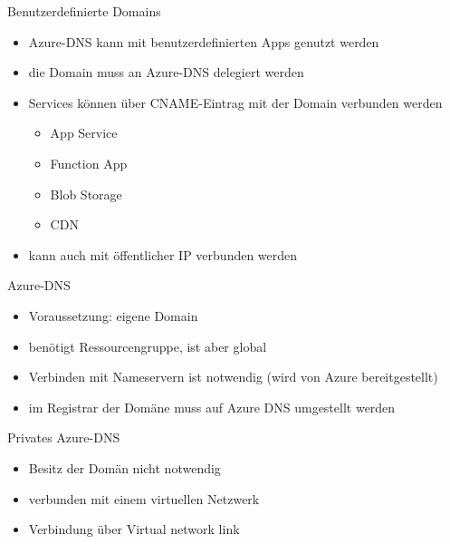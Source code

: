 \begin{flashcard}[]{Benutzerdefinierte Domains}
  \begin{itemize}
    \item Azure-DNS kann mit benutzerdefinierten Apps genutzt werden
    \item die Domain muss an Azure-DNS delegiert werden
    \item Services können über CNAME-Eintrag mit der Domain verbunden werden
      \begin{itemize}
        \item App Service
        \item Function App
        \item Blob Storage
        \item CDN
      \end{itemize}
    \item kann auch mit öffentlicher IP verbunden werden
  \end{itemize}
\end{flashcard}

\begin{flashcard}[]{Azure-DNS}
  \begin{itemize}
    \item Voraussetzung: eigene Domain
    \item benötigt Ressourcengruppe, ist aber global
    \item Verbinden mit Nameservern ist notwendig (wird von Azure bereitgestellt)
    \item im Registrar der Domäne muss auf Azure DNS umgestellt werden
  \end{itemize}
\end{flashcard}

\begin{flashcard}[]{Privates Azure-DNS}
  \begin{itemize}
    \item Besitz der Domän nicht notwendig
    \item verbunden mit einem virtuellen Netzwerk
    \item Verbindung über Virtual network link
  \end{itemize}
\end{flashcard}

